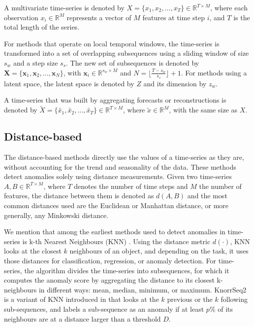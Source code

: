 A multivariate time-series is denoted by $X = \{x_1, x_2, \ldots, x_T\} \in \mathbb{R}^{T \times M}$, where each observation $x_i \in \mathbb{R}^{M}$ represents a vector of $M$ features at time step $i$, and $T$ is the total length of the series. 

For methods that operate on local temporal windows, the time-series is transformed into a set of overlapping subsequences using a sliding window of size $s_w$ and a step size $s_s$. The new set of subsequences is denoted by $\textbf{X} = \{\textbf{x}_1, \textbf{x}_2, \ldots, \textbf{x}_N\}$, with $\textbf{x}_i \in \mathbb{R}^{s_w \times M}$ and $N = \lfloor \frac{T - s_w}{s_s} \rfloor  + 1$. For methods using a latent space, the latent space is denoted by $Z$ and its dimension by $z_w$.

A time-series that was built by aggregating forecasts or reconstructions is denoted by $ \tilde{X} = \{\tilde{x_1}, \tilde{x_2}, \dots, \tilde{x_T}\} \in \mathbb{R}^{T \times M}$, where $\tilde{x} \in \mathbb{R}^{M}$, with the same size as $X$.

\subsection{Distance-based}
The distance-based methods directly use the values of a time-series as they are, without accounting for the trend and seasonality of the data. These methods detect anomalies solely using distance measurements. Given two time-series $A, B \in \mathbb{R}^{T \times M}$, where $T$ denotes the number of time steps and $M$ the number of features, the distance between them is denoted as $d(A, B)$ and the most common distances used are the Euclidean or Manhattan distance, or more generally, any Minkowski distance.

We mention that among the earliest methods used to detect anomalies in time-series is k-th Nearest Neighbours (KNN) \cite{angiulli2002knn-ad}. Using the distance metric $d(\cdot)$, KNN looks at the closest $k$ neighbours of an object, and depending on the task, it uses those distances for classification, regression, or anomaly detection. For time-series, the algorithm divides the time-series into subsequences, for which it computes the anomaly score by aggregating the distance to its closest k-neighbours in different ways: mean, median, minimum, or maximum. KnorrSeq2 is a variant of KNN introduced in \cite{palshikar2005knorrseq} that looks at the $k$ previous or the $k$ following sub-sequences, and labels a sub-sequence as an anomaly if at least $p\%$ of its neighbours are at a distance larger than a threshold $D$.

